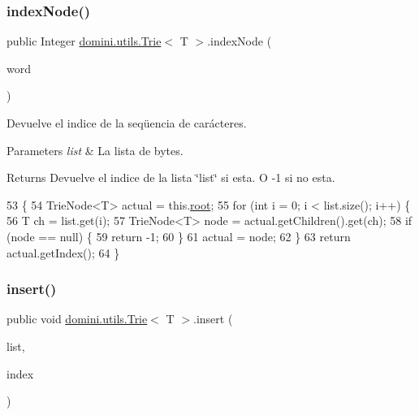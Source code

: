 \subsubsection{\texorpdfstring{index\+Node()}{indexNode()}}
{\footnotesize\ttfamily public Integer \hyperlink{classdomini_1_1utils_1_1Trie}{domini.\+utils.\+Trie}$<$ T $>$.index\+Node (\begin{DoxyParamCaption}\item[{Array\+List$<$ T $>$}]{word }\end{DoxyParamCaption})\hspace{0.3cm}{\ttfamily [inline]}}



Devuelve el indice de la seqüencia de carácteres. 


\begin{DoxyParams}{Parameters}
{\em list} & La lista de bytes. \\
\hline
\end{DoxyParams}
\begin{DoxyReturn}{Returns}
Devuelve el indice de la lista \char`\"{}list\char`\"{} si esta. O -\/1 si no esta. 
\end{DoxyReturn}

\begin{DoxyCode}
53                                                 \{
54         TrieNode<T> actual = this.\hyperlink{classdomini_1_1utils_1_1Trie_a60ef63a6c55d07710d33892ccc899bce}{root};
55         \textcolor{keywordflow}{for} (\textcolor{keywordtype}{int} i = 0; i < list.size(); i++) \{
56             T ch = list.get(i);
57             TrieNode<T> node = actual.getChildren().get(ch);
58             \textcolor{keywordflow}{if} (node == null) \{
59                 \textcolor{keywordflow}{return} -1;
60             \}
61             actual = node;
62         \}
63         \textcolor{keywordflow}{return} actual.getIndex();
64     \}
\end{DoxyCode}
\mbox{\label{classdomini_1_1utils_1_1Trie_a3599001d9b056f0b54ab7eabb9d3510b}} 
\subsubsection{\texorpdfstring{insert()}{insert()}}
{\footnotesize\ttfamily public void \hyperlink{classdomini_1_1utils_1_1Trie}{domini.\+utils.\+Trie}$<$ T $>$.insert (\begin{DoxyParamCaption}\item[{Array\+List$<$ T $>$}]{list,  }\item[{Integer}]{index }\end{DoxyParamCaption})\hspace{0.3cm}{\ttfamily [inline]}}



